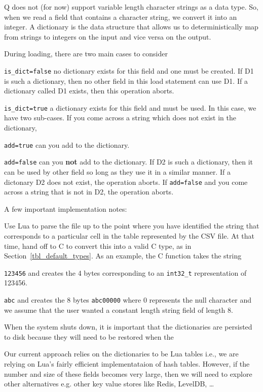 \documentclass[letterpaper]{article}
\begin{document}
Q does not (for now) support variable length character strings as a
data type.  So, when we read a field that contains a character string,
we convert it into an integer. A dictionary is the data structure that allows us
to deterministically map from strings to integers on the input and vice versa on
the output.

During loading, there are two main cases to consider
\be
\item \verb+is_dict=false+ no dictionary exists for this field and one must be created. If D1 is such
  a dictionary, then no other field in this load statement can use D1. If a
  dictionary called D1 exists, then this operation aborts.
\item \verb+is_dict=true+ a dictionary exists for this field and must be used. In this case, we have
  two sub-cases.  If you come across a string which does not exist in the dictionary, 
  \be
\item \verb+add=true+ can you add to the dictionary. 
\item \verb+add=false+ can you {\bf not} add to the dictionary. 
  \ee
  If D2 is such a dictionary, then it can be used by other field so long as they
  use it in a similar manner. If a dictonary D2 does not exist, the operation
  aborts. If \verb+add=false+ and you come across a string that is not in D2,
  the operation aborts.
  \ee

A few important implementation notes:
\be
\item Use Lua to parse the file up to the point where you have identified the
  string that corresponds to a particular cell in the table represented by the
  CSV file. At that time, hand off to C to convert this into a valid C type, as
  in Section~\ref{tbl_default_types}. As an example, the C function takes the
  string 
  \be
\item \verb+123456+ and creates the 4 bytes corresponding to an
  \verb+int32_t+ representation of 123456.
\item \verb+abc+ and creates the 8 bytes \verb+abc00000+ where 0 represents the
  null character and we assume that the user wanted a constant length string
  field of length 8.
  \ee


\item 
When the system shuts down, it is important that the dictionaries are persisted
to disk because they will need to be restored when the 
\item Our current approach relies on the dictionaries to be Lua tables i.e., we
  are relying on Lua's fairly efficient implementataion of hash tables. However,
  if the number and size of these fields becomes very large, then we will need
  to explore other alternatives e.g. other key value stores like Redis, LevelDB,
  \ldots
  \ee
\end{document}
